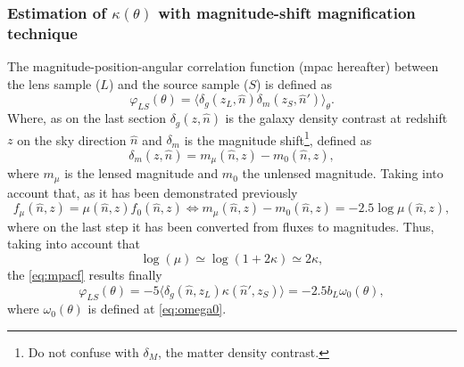 \subsubsection{Estimation of $\kappa(\theta)$ with magnitude-shift magnification technique}
The magnitude-position-angular correlation function (mpac hereafter) between the lens sample ($L$) and the source sample ($S$) is defined as
\begin{equation}
\varphi_{LS}(\theta) = \langle\delta_g(z_L,\hat n)\delta_m(z_S,\hat n')\rangle_\theta.
\label{eq:mpacf}
\end{equation}
Where, as on  the last section $\delta_g (z,\hat n)$ is the galaxy density contrast at redshift $z$ on the sky direction $\hat n$ and $\delta_m$ is the magnitude shift\footnote{Do not confuse with $\delta_M$, the matter density contrast.}, defined as
\begin{equation}
\delta_m(z,\hat n) = m_\mu(\hat n,z)-m_0(\hat n,z),
\end{equation}
where $m_\mu$ is the lensed magnitude and $m_0$ the unlensed magnitude. Taking into account that, as it has been demonstrated previously
\begin{equation}
f_\mu(\hat n,z) = \mu(\hat n,z)f_0(\hat n,z) \Leftrightarrow m_\mu(\hat n,z)-m_0(\hat n,z) = -2.5\log\mu(\hat n,z),
\end{equation}
where on the last step it has been converted from fluxes to magnitudes. Thus, taking into account that
\begin{equation}
\log(\mu) \simeq \log(1+2\kappa)\simeq 2\kappa,
\end{equation}
the \autoref{eq:mpacf} results finally
\begin{equation}
\varphi_{LS}(\theta)= -5\langle\delta_g(\hat n,z_L)\kappa(\hat n',z_S)\rangle = -2.5b_L\omega_0(\theta),
\end{equation}
where $\omega_0(\theta)$ is defined at \autoref{eq:omega0}.
\newline

